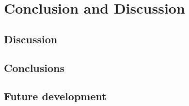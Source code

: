\chapter{Conclusion and Discussion}

\section{Discussion}

\section{Conclusions}

\section{Future development}

